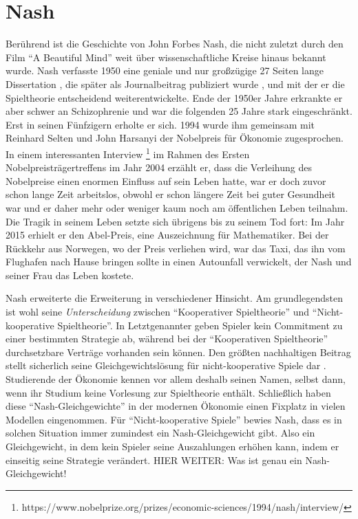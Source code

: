 \section{Nash}
Berührend ist die Geschichte von John Forbes Nash, die nicht zuletzt durch den Film "`A Beautiful Mind"' weit über wissenschaftliche Kreise hinaus bekannt wurde. Nash verfasste 1950 eine geniale und nur großzügige\parencite[S. 164]{Nash1994} 27 Seiten lange Dissertation \parencite{Nash1950}, die später als Journalbeitrag publiziert wurde \parencite{Nash1951}, und mit der er die Spieltheorie entscheidend weiterentwickelte. Ende der 1950er Jahre erkrankte er aber schwer an Schizophrenie und war die folgenden 25 Jahre stark eingeschränkt. Erst in seinen Fünfzigern erholte er sich. 1994 wurde ihm gemeinsam mit Reinhard Selten und John Harsanyi der Nobelpreis für Ökonomie zugesprochen. In einem interessanten Interview \parencite{Nash2004}\footnote{https://www.nobelprize.org/prizes/economic-sciences/1994/nash/interview/} im Rahmen des Ersten Nobelpreisträgertreffens im Jahr 2004 erzählt er, dass die Verleihung des Nobelpreise einen enormen Einfluss auf sein Leben hatte, war er doch zuvor schon lange Zeit arbeitslos, obwohl er schon längere Zeit bei guter Gesundheit war und er daher mehr oder weniger kaum noch am öffentlichen Leben teilnahm. Die Tragik in seinem Leben setzte sich übrigens bis zu seinem Tod fort: Im Jahr 2015 erhielt er den Abel-Preis, eine Auszeichnung für Mathematiker. Bei der Rückkehr aus Norwegen, wo der Preis verliehen wird, war das Taxi, das ihn vom Flughafen nach Hause bringen sollte in einen Autounfall verwickelt, der Nash und seiner Frau das Leben kostete. 

Nash erweiterte die Erweiterung in verschiedener Hinsicht. Am grundlegendsten ist wohl seine \textit{Unterscheidung} zwischen "`Kooperativer Spieltheorie"' und "`Nicht-kooperative Spieltheorie"'. In Letztgenannter geben Spieler kein Commitment zu einer bestimmten Strategie ab, während bei der "`Kooperativen Spieltheorie"' durchsetzbare Verträge vorhanden sein können.
Den größten nachhaltigen Beitrag stellt sicherlich seine Gleichgewichtslösung für nicht-kooperative Spiele dar \parencite{Nash1951, Nash1950b}. Studierende der Ökonomie kennen vor allem deshalb seinen Namen, selbst dann, wenn ihr Studium keine Vorlesung zur Spieltheorie enthält. Schließlich haben diese "`Nash-Gleichgewichte"' in der modernen Ökonomie einen Fixplatz in vielen Modellen eingenommen. Für "`Nicht-kooperative Spiele"' bewies Nash, dass es in solchen Situation immer zumindest ein Nash-Gleichgewicht gibt. Also ein Gleichgewicht, in dem kein Spieler seine Auszahlungen erhöhen kann, indem er einseitig seine Strategie verändert. HIER WEITER: Was ist genau ein Nash-Gleichgewicht!





